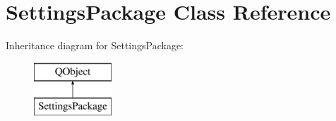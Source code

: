 \hypertarget{class_settings_package}{}\section{Settings\+Package Class Reference}
\label{class_settings_package}
Inheritance diagram for Settings\+Package\+:\begin{figure}[H]
\begin{center}
\leavevmode
\includegraphics[height=2.000000cm]{class_settings_package}
\end{center}
\end{figure}
